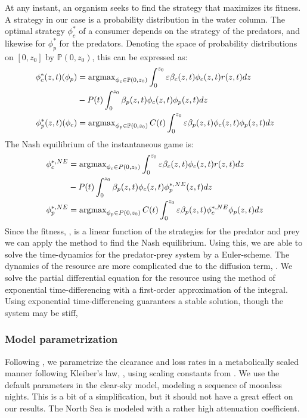 At any instant, an organism seeks to find the strategy that maximizes its fitness. A strategy in our case is a probability distribution in the water column. The optimal strategy $\phi_c^*$ of a consumer depends on the strategy of the predators, and likewise for $\phi_p^*$ for the predators. Denoting the space of probability distributions on $[0,z_0]$ by $\mathbb{P}(0,z_0)$, this can be expressed as:
\begin{align*}
	\phi_c^*(z,t)(\phi_p) &= \argmax_{\phi_c \in \mathbb{P}(0,z_0)}  \int_0^{z_0} \varepsilon \beta_c(z,t)\phi_c(z,t)r(z,t) dz \\ &- P(t)\int_0^{z_0} \beta_p(z,t) \phi_c(z,t) \phi_p(z,t)dz  \\
	\phi_p^*(z,t)(\phi_c) &= \argmax_{\phi_p \in \mathbb{P}(0,z_0)}C(t) \int_0^{z_0} \varepsilon \beta_p(z,t)\phi_c(z,t)\phi_p(z,t) dz
\end{align*}
The Nash equilibrium of the instantaneous game is:
\begin{align}
  \label{eq:nash_equilibria}
	\phi_c^{*,NE} &=  \argmax_{\phi_c \in P(0,z_0)}  \int_0^{z_0} \varepsilon \beta_c(z,t)\phi_c(z,t)r(z,t) dz \\ &- P(t)\int_0^{z_0} \beta_p(z,t) \phi_c(z,t) \phi_p^{*,NE}(z,t) dz \\
	\phi_p^{*,NE} &=  \argmax_{\phi_p \in P(0,z_0)}C(t) \int_0^{z_0} \varepsilon \beta_p(z,t)\phi_c^{*,NE} \phi_p(z,t) dz
\end{align}
Since the fitness, , is a linear function of the strategies for the predator and prey we can apply the method  to find the Nash equilibrium. Using this, we are able to solve the time-dynamics for the predator-prey system by a Euler-scheme. The dynamics of the resource are more complicated due to the diffusion term, . We solve the partial differential equation for the resource using the method of exponential time-differencing with a first-order approximation of the integral. Using exponential time-differencing guarantees a stable solution, though the system may be stiff, \cite{hochbruck2010exponential}

\subsubsection*{Model parametrization}
Following \citep{yodzis1992body}, we parametrize the clearance and loss rates in a metabolically scaled manner following Kleiber's law, \citep{yodzis1992body}, using scaling constants from \citep{kha_2019}. We use the default parameters in the clear-sky model, modeling a sequence of moonless nights. This is a bit of a simplification, but it should not have a great effect on our results. The North Sea is modeled with a rather high attenuation coefficient.


